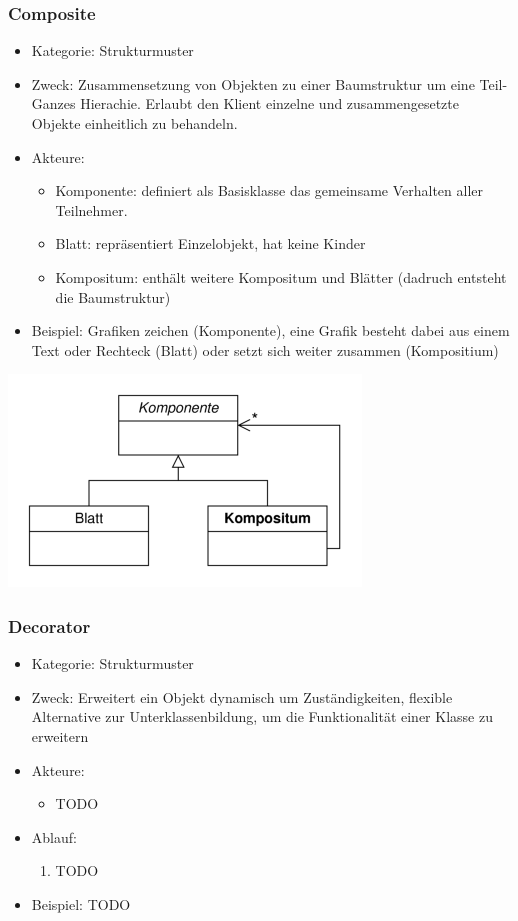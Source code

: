 \documentclass[11pt, fleqn, a4paper, leqno]{scrartcl} %
\begin{document}
		\subsubsection{Composite}
			\begin{itemize}
				\item Kategorie: Strukturmuster
				\item Zweck: Zusammensetzung von Objekten zu einer Baumstruktur um eine Teil-Ganzes Hierachie. Erlaubt den Klient einzelne und zusammengesetzte Objekte einheitlich zu behandeln.
				\item Akteure: 
					\begin{itemize}
						\item Komponente: definiert als Basisklasse das gemeinsame Verhalten aller Teilnehmer.
						\item Blatt: repräsentiert Einzelobjekt, hat keine Kinder
						\item Kompositum: enthält weitere Kompositum und Blätter (dadruch entsteht die Baumstruktur)
					\end{itemize}
				\item Beispiel: Grafiken zeichen (Komponente), eine Grafik besteht dabei aus einem Text oder Rechteck (Blatt) oder setzt sich weiter zusammen (Kompositium)
			\end{itemize}
			\includegraphics[scale=0.7]{images/composite.png}
			\newpage
		\subsubsection{Decorator}
			\begin{itemize}
				\item Kategorie: Strukturmuster
				\item Zweck: Erweitert ein Objekt dynamisch um Zuständigkeiten, flexible Alternative zur Unterklassenbildung, um die Funktionalität einer Klasse zu erweitern
				\item Akteure: 
					\begin{itemize}
						\item TODO
					\end{itemize}
				\item Ablauf:
					\begin{enumerate}
						\item TODO
					\end{enumerate}
				\item Beispiel: TODO
			\end{itemize}
			\newpage
\end{document}
